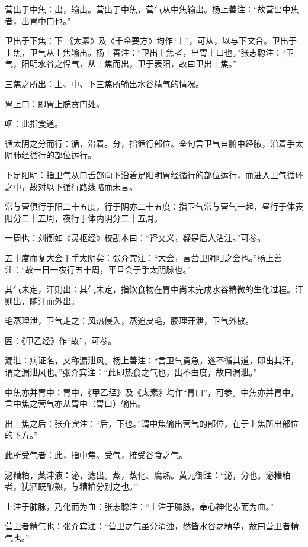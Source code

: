 \documentclass[12pt]{ctexbook}
\begin{document}

\begin{jiaozhu}
	\item 营出于中焦：出，输出。营出于中焦，营气从中焦输出。杨上善注：“故营出中焦者，出胃中口也。”
	\item 卫出于下焦：下·《太素》及《千金要方》均作“上”，可从，以与下文合。卫出于上焦，卫气从上焦输出。杨上善注：“卫出上焦者，出胃上口也。”张志聪注：“卫气，阳明水谷之悍气，从上焦而出，卫于表阳，故曰卫出上焦。”
	\item 三焦之所出：上、中、下三焦所输出水谷精气的情况。
	\item 胃上口：即胃上脘贲门处。
	\item 咽：此指食道。
	\item 循太阴之分而行：循，沿着。分，指循行部位。全句言卫气自腑中经腋，沿着手太阴肺经循行的部位运行。
	\item 下足阳明：指卫气从口舌部向下沿着足阳明胃经循行的部位运行，而进入卫气循环之中，故对以下循行路线略而未言。
	\item 常与营俱行于阳二十五度，行于阴亦二十五度：指卫气常与营气一起，昼行于体表阳分二十五周，夜行于体内阴分二十五周。
	\item 一周也：刘衡如《灵枢经》校勘本曰：“译文义，疑是后人沾注。”可参。
	\item 五十度而复大会于手太阴矣：张介宾注：“大会，言营卫阴阳之会也。”杨上善注：“故一日一夜行五十周，平旦会于手太阴脉也。”
	\item 其气未定，汗则出：其气未定，指饮食物在胃中尚未完成水谷精微的生化过程。汗则出，随汗而外出。
	\item 毛蒸理泄，卫气走之：风热侵入，蒸迫皮毛，腠理开泄，卫气外散。
	\item 固：《甲乙经》作“故”，可参。
	\item 漏泄：病证名，又称漏泄风。杨上善注：“言卫气勇急，遂不循其道，即出其汗，谓之漏泄风也。”张介宾注：“此即热食之气也，出不由度，故曰漏泄。”
	\item 中焦亦并胃中：胃中，《甲乙经》及《太素》均作“胃口”，可参。中焦亦并胃中，言中焦之营气亦从胃中（胃口）输出。
	\item 出上焦之后：张介宾注：“后，下也。”谓中焦输出营气的部位，在于上焦所出部位的下方。”
	\item 此所受气者：此，指中焦。受气，接受谷食之气。
	\item 泌糟粕，蒸津液：泌，滤出。蒸，蒸化、腐熟。黄元御注：“泌，分也。泌糟粕者，犹酒既酿熟，与糟粕分别之也。”
	\item 上注于肺脉，乃化而为血：张志聪注：“上注于肺脉，奉心神化赤而为血。”
	\item 营卫者精气也：张介宾注：“营卫之气虽分清浊，然皆水谷之精华，故曰营卫者精气也。”

\end{jiaozhu}
\end{document}
